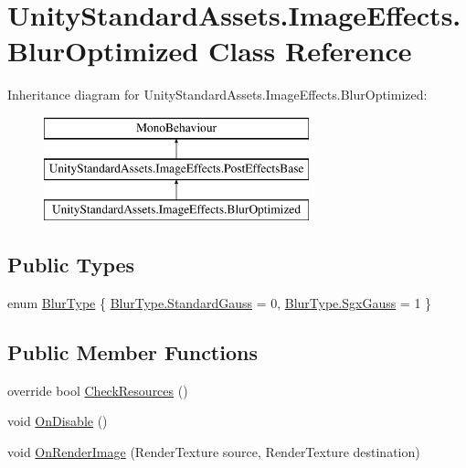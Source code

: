 \hypertarget{class_unity_standard_assets_1_1_image_effects_1_1_blur_optimized}{}\section{Unity\+Standard\+Assets.\+Image\+Effects.\+Blur\+Optimized Class Reference}
\label{class_unity_standard_assets_1_1_image_effects_1_1_blur_optimized}
Inheritance diagram for Unity\+Standard\+Assets.\+Image\+Effects.\+Blur\+Optimized\+:\begin{figure}[H]
\begin{center}
\leavevmode
\includegraphics[height=3.000000cm]{class_unity_standard_assets_1_1_image_effects_1_1_blur_optimized}
\end{center}
\end{figure}
\subsection*{Public Types}
\begin{DoxyCompactItemize}
\item 
enum \mbox{\hyperlink{class_unity_standard_assets_1_1_image_effects_1_1_blur_optimized_a5e014aebbf344dbbec6748cd537b0790}{Blur\+Type}} \{ \mbox{\hyperlink{class_unity_standard_assets_1_1_image_effects_1_1_blur_optimized_a5e014aebbf344dbbec6748cd537b0790acf52c93fe9c4abb6723ffded2ad3d603}{Blur\+Type.\+Standard\+Gauss}} = 0, 
\mbox{\hyperlink{class_unity_standard_assets_1_1_image_effects_1_1_blur_optimized_a5e014aebbf344dbbec6748cd537b0790ae495e7c6368fbaa74bee67eb9c985c19}{Blur\+Type.\+Sgx\+Gauss}} = 1
 \}
\end{DoxyCompactItemize}
\subsection*{Public Member Functions}
\begin{DoxyCompactItemize}
\item 
override bool \mbox{\hyperlink{class_unity_standard_assets_1_1_image_effects_1_1_blur_optimized_a5d4870a78379d6dd5d74afcf5dbd79e5}{Check\+Resources}} ()
\item 
void \mbox{\hyperlink{class_unity_standard_assets_1_1_image_effects_1_1_blur_optimized_acf5c55ca6e567831664893b623c5d446}{On\+Disable}} ()
\item 
void \mbox{\hyperlink{class_unity_standard_assets_1_1_image_effects_1_1_blur_optimized_abec08a4c7ce57545389426ca41a6491d}{On\+Render\+Image}} (Render\+Texture source, Render\+Texture destination)
\end{DoxyCompactItemize}
